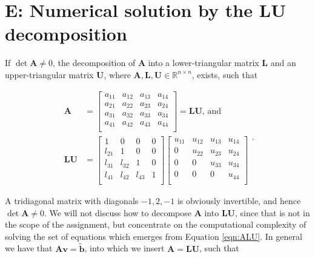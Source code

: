 \documentclass[]{article}
\begin{document}
\section*{E: Numerical solution by the $\mathbf{LU}$ decomposition}
If $\det \mathbf{A} \neq 0$, the decomposition of $\mathbf{A}$ into a lower-triangular matrix $\mathbf{L}$ and an upper-triangular matrix $\mathbf{U}$, where $\mathbf{A},\mathbf{L},\mathbf{U} \in \mathbb{R}^{n \times n}$, exists, such that


\begin{equation}
\begin{split}
\label{eqn:ALU}
\mathbf{A} 
&= 
\left[ \begin{matrix}
a_{11} & a_{12} & a_{13} & a_{14} \\
a_{21} & a_{22} & a_{23} & a_{24} \\
a_{31} & a_{32} & a_{33} & a_{34} \\
a_{41} & a_{42} & a_{43} & a_{44} \\
\end{matrix} \right]
= \mathbf{LU} \text{, and} \\
\mathbf{LU} &=
\left[ \begin{matrix}
1 & 0      & 0      & 0      \\
l_{21} &      1 & 0      & 0      \\
l_{31} & l_{32} &      1 & 0      \\
l_{41} & l_{42} & l_{43} & 1      \\
\end{matrix} \right]
\left[ \begin{matrix}
u_{11} & u_{12} & u_{13} & u_{14} \\
0 & u_{22} & u_{23} & u_{24} \\
0 & 0 & u_{33} & u_{34} \\
0 & 0 & 0 & u_{44} \\
\end{matrix} \right]
\end{split}
\text{.}
\end{equation}

A tridiagonal matrix with diagonals $-1, 2, -1$ is obviously invertible, and hence $\det \mathbf{A} \neq 0$. We will not discuss how to decompose $\mathbf{A}$ into $\mathbf{LU}$, since that is not in the scope of the assignment, but concentrate on the computational complexity of solving the set of equations which emerges from Equation \ref{eqn:ALU}. In general we have that $\mathbf{Av} = \mathbf{\tilde{b}}$, into which we insert $\mathbf{A} = \mathbf{LU}$, such that
\end{document}
